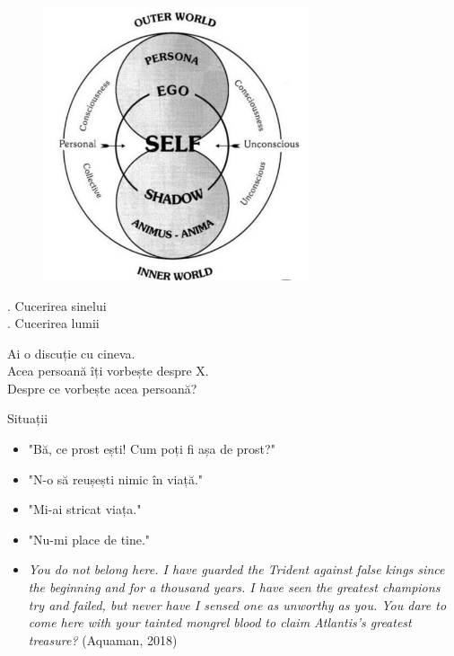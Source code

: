 \documentclass{simple}
\begin{document}
\begin{frame}{}
  \begin{figure}
    \centering
    \includegraphics[width=0.7\textwidth]{img/outer-world-inner-world}
  \end{figure}
\end{frame}

\begin{frame}{}
  \centering
  . Cucerirea sinelui \\
  \vspace{3mm}
  . Cucerirea lumii
\end{frame}

\begin{frame}{}
  \centering
  \pause Ai o discuție cu cineva. \\
  \vspace{3mm}
  \pause Acea persoană îți vorbește despre X. \\
  \vspace{3mm}
  \pause Despre ce vorbește acea persoană?
\end{frame}

\begin{frame}{Situații}
  \begin{itemize}
    \pause \item "Bă, ce prost ești! Cum poți fi așa de prost?"
    \pause \item "N-o să reușești nimic în viață."
    \pause \item "Mi-ai stricat viața."
    \pause \item "Nu-mi place de tine."
    \pause \item \textit{You do not belong here. I have guarded the Trident against false kings since the beginning and for a thousand years. I have seen the greatest champions try and failed, but never have I sensed one as unworthy as you. You dare to come here with your tainted mongrel blood to claim Atlantis's greatest treasure?} (Aquaman, 2018)
  \end{itemize}
\end{frame}
\end{document}
